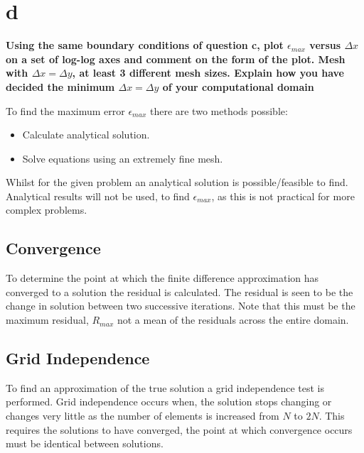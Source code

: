 \documentclass[10pt, a4paper]{article}
\begin{document}
\section*{d}
\textbf{Using the same boundary conditions of question c, plot $\epsilon_{max}$ versus $\Delta x$ on a set of log-log axes and comment on the form of the plot. Mesh with $\Delta x = \Delta y$, at least 3 different mesh sizes.  Explain how you have decided the minimum $\Delta x = \Delta y$ of your computational domain}

To find the maximum error $\epsilon_{max}$ there are two methods possible:
\begin{itemize}
	\item Calculate analytical solution.
	\item Solve equations using an extremely fine mesh.
\end{itemize}

Whilst for the given problem an analytical solution is possible/feasible to find. Analytical results will not be used, to find $\epsilon_{max}$, as this is not practical for more complex problems.

\subsection*{Convergence}

To determine the point at which the finite difference approximation has converged to a solution the residual is calculated. The residual is seen to be the change in solution between two successive iterations. Note that this must be the maximum residual, $R_{max}$ not a mean of the residuals across the entire domain.

\subsection*{Grid Independence}
To find an approximation of the true solution a grid independence test is performed. Grid independence occurs when, the solution stops changing or changes very little as the number of elements is increased from $N$ to $2N$. This requires the solutions to have converged, the point at which convergence occurs must be identical between solutions. 
\end{document}
